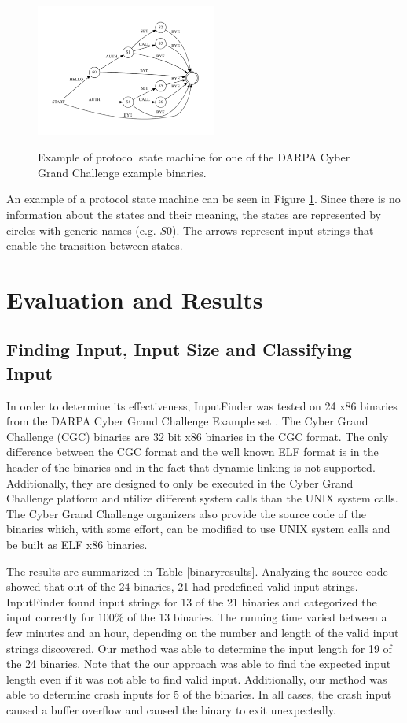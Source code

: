 \documentclass{acm_proc_article-sp}
\def \tool {InputFinder}
\def \numbinaries {24}
\begin{document}
\begin{figure}[h!]
\caption{Example of protocol state machine for one of the DARPA Cyber Grand Challenge example binaries.}
\centering
\includegraphics[width=0.53\textwidth]{protocoldiagram.pdf}
\label{fig:psm_example}
\end{figure}

An example of a protocol state machine can be seen in Figure \ref{fig:psm_example}.
Since there is no information about the states and their meaning, the states are represented by circles with generic names (e.g. $S0$).
The arrows represent input strings that enable the transition between states.

\section{Evaluation and Results} \label{results}
\subsection{Finding Input, Input Size and Classifying Input}
In order to determine its effectiveness, \tool{} was tested on \numbinaries{} x86 binaries from the DARPA Cyber Grand Challenge Example set \cite{darpacgc}.
The Cyber Grand Challenge (CGC) binaries are 32 bit x86 binaries in the CGC format.
The only difference between the CGC format and the well known ELF format is in the header of the binaries and in the fact that dynamic linking is not supported.
Additionally, they are designed to only be executed in the Cyber Grand Challenge platform and utilize different system calls than the UNIX system calls.
The Cyber Grand Challenge organizers also provide the source code of the binaries which, with some effort, can be modified to use UNIX system calls and be built as ELF x86 binaries.

The results are summarized in Table \ref{binaryresults}.
Analyzing the source code showed that out of the \numbinaries{} binaries, 21 had predefined valid input strings.
\tool{} found input strings for 13 of the 21 binaries and categorized the input correctly for 100\% of the 13 binaries.
The running time varied between a few minutes and an hour, depending on the number and length of the valid input strings discovered.
Our method was able to determine the input length for 19 of the 24 binaries.
Note that the our approach was able to find the expected input length even if it was not able to find valid input.
Additionally, our method was able to determine crash inputs for 5 of the binaries.
In all cases, the crash input caused a buffer overflow and caused the binary to exit unexpectedly.
\end{document}
